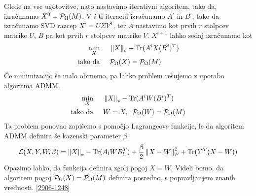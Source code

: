 Glede na vse ugotovitve, nato nastavimo iterativni algoritem, tako da, izračunamo $X^0 = \mathcal{P}_\Omega(M)$. V $i$-ti iteraciji izračunamo $A^i$ in $B^i$, tako da izračunamo SVD razcep $X^i = U \Sigma V^T$, ter $A$ nastavimo kot prvih $r$ stolpcev matrike $U$, $B$ pa kot prvih $r$ stolpcev matrike $V$. $X^{i+1}$ lahko sedaj izračunamo kot \cite{TNNM-HZYLH12}
\begin{align*}
    \min_X \hspace{0.5cm}         & \left\lVert X\right\rVert_* - \text{Tr}(A^iX(B^i)^T) \\
    \text{tako da} \hspace{0.5cm} & \mathcal{P}_\Omega(X) = \mathcal{P}_\Omega(M)
\end{align*}
Če minimizacijo še malo obrnemo, pa lahko problem rešujemo z uporabo algoritma ADMM. 
\begin{align*}
    \min_X \hspace{0.5cm}         & \left\lVert X\right\rVert_* - \text{Tr}(A^iW(B^i)^T)              \\
    \text{tako da} \hspace{0.5cm} & W=X, \hspace{0.2cm} \mathcal{P}_\Omega(W) = \mathcal{P}_\Omega(M)
\end{align*}
Ta problem ponovno zapišemo s pomočjo Lagrangeove funkcije, le da algoritem ADMM definira še kazenski parameter $\beta$. \cite{TNNM-HZYLH12} 
\[
    \mathcal{L}(X, Y, W, \beta) = \left\lVert X\right\rVert_* - \text{Tr}(A_l W B_l^T) + \frac{\beta}{2} \left\lVert X - W\right\rVert_F^2 + \text{Tr}(Y^T(X-W))
\]
Opazimo lahko, da funkcija definira zgolj pogoj $X = W$. Videli bomo, da algoritem pogoj $\mathcal{P}_\Omega(X) = \mathcal{P}_\Omega(M)$ definira posredno, s popravljanjem znanih vrednosti. \eqref{2906-1248} 

